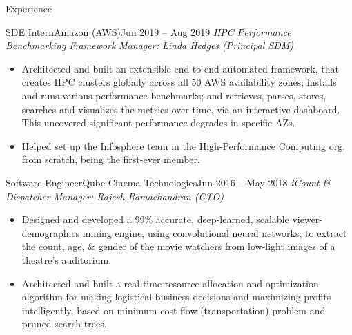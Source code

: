 \documentclass[]{mcdowellcv}
\begin{document}
	\begin{cvsection}{Experience}
	        \begin{cvsubsection}{SDE Intern}{Amazon (AWS)}{Jun 2019 – Aug 2019}
			\textit{HPC Performance Benchmarking Framework} \hfill \textit{Manager: Linda Hedges (Principal SDM)}
			\begin{itemize}
            \item Architected and built an extensible end-to-end automated framework, that creates HPC clusters globally across all 50 AWS availability zones; installs and runs various performance benchmarks; and retrieves, parses, stores, searches and visualizes the metrics over time, via an interactive dashboard. This uncovered significant performance degrades in specific AZs. %
            \item Helped set up the Infosphere team in the High-Performance Computing org, from scratch, being the first-ever member.
			\end{itemize}
		\end{cvsubsection}

		\begin{cvsubsection}{Software Engineer}{Qube Cinema Technologies}{Jun 2016 – May 2018}
			\textit{iCount \& Dispatcher} \hfill \textit{Manager: Rajesh Ramachandran (CTO)}
			\begin{itemize}
            \item Designed and developed a 99\% accurate, deep-learned, scalable viewer-demographics mining engine, using convolutional neural networks, to extract the count, age, \& gender of the movie watchers from low-light images of a theatre's auditorium. %
            \item Architected and built a real-time resource allocation and optimization algorithm for making logistical business decisions and maximizing profits intelligently, based on minimum cost flow (transportation) problem and pruned search trees.
			\end{itemize}
		\end{cvsubsection}



\end{cvsection}
\end{document}
